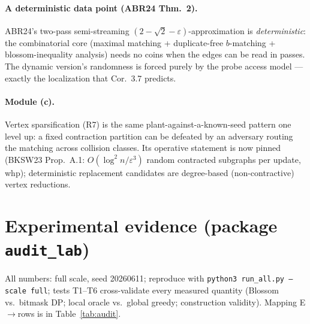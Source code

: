 \documentclass[11pt]{article}
\begin{document}
\paragraph{A deterministic data point (ABR24 Thm.~2).} ABR24's two-pass
semi-streaming $(2-\sqrt2-\varepsilon)$-approximation is
\emph{deterministic}: the combinatorial core (maximal matching +
duplicate-free $b$-matching + blossom-inequality analysis) needs no coins
when the edges can be read in passes. The dynamic version's randomness is
forced purely by the probe access model --- exactly the localization that
Cor.~3.7 predicts.

\paragraph{Module (c).} Vertex sparsification (R7) is the same
plant-against-a-known-seed pattern one level up: a fixed contraction
partition can be defeated by an adversary routing the matching across
collision classes. Its operative statement is now pinned (BKSW23 Prop.~A.1:
$O(\log^2 n/\varepsilon^3)$ random contracted subgraphs per update, whp);
deterministic replacement candidates are degree-based (non-contractive)
vertex reductions.

\section{Experimental evidence (package \texttt{audit\_lab})}\label{sec:experiments}

All numbers: full scale, seed 20260611; reproduce with
\texttt{python3 run\_all.py --scale full}; tests T1--T6 cross-validate every
measured quantity (Blossom vs.\ bitmask DP; local oracle vs.\ global greedy;
construction validity). Mapping E$\to$rows is in Table~\ref{tab:audit}.
\end{document}
